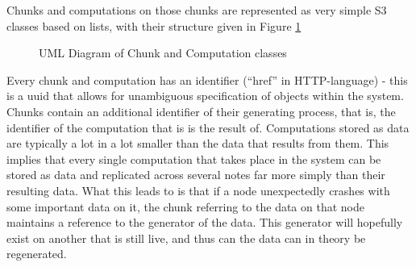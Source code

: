 Chunks and computations on those chunks are represented as very simple S3 classes based on lists, with their structure given in Figure \ref{fig:largerscale}

\begin{figure}

\caption{UML Diagram of Chunk and Computation classes}
\label{fig:largerscale}
\end{figure}

Every chunk and computation has an identifier (``href'' in HTTP-language) - this is a uuid that allows for unambiguous specification of objects within the system.
Chunks contain an additional identifier of their generating process, that is, the identifier of the computation that is is the result of.
Computations stored as data are typically a lot in a lot smaller than the data that results from them.
This implies that every single computation that takes place in the system can be stored as data and replicated across several notes far more simply than their resulting data.
What this leads to is that if a node unexpectedly crashes with some important data on it, the chunk referring to the data on that node maintains a reference to the generator of the data.
This generator will hopefully exist on another that is still live, and thus can the data can in theory be regenerated.
